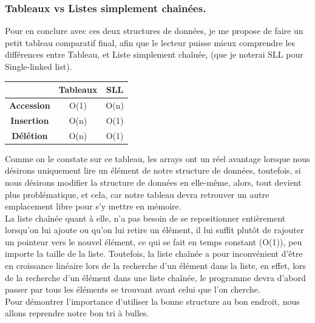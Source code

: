 \documentclass[a4paper, 12pt]{article}
\numberwithin{equation}{subsection}
\begin{document}
\subsubsection{Tableaux vs Listes simplement chaînées.}
Pour en conclure avec ces deux structures de données, je me propose de faire un petit tableau comparatif final, afin que le lecteur puisse mieux comprendre les différences entre Tableau, et Liste simplement chaînée, (que je noterai SLL pour Single-linked list).
\begin{table}[H]
  \centering
  \begin{tabular}{|c|c|c|}
    \hline & Tableaux & SLL \\
    \hline {\bf Accession} & O(1) & O(n) \\
    \hline {\bf Insertion} & O(n) & O(1) \\
    \hline {\bf Délétion}  & O(n) & O(1) \\
    \hline
  \end{tabular}
\end{table} \smallskip
Comme on le constate sur ce tableau, les arrays ont un réel avantage lorsque nous désirons uniquement lire un élément de notre structure de données, toutefois, si nous désirons modifier la structure de données en elle-même, alors, tout devient plus problématique, et cela, car notre tableau devra retrouver un autre emplacement libre pour s'y mettre en mémoire. \\

La liste chaînée quant à elle, n'a pas besoin de se repositionner entièrement lorsqu'on lui ajoute ou qu'on lui retire un élément, il lui suffit plutôt de rajouter un pointeur vers le nouvel élément, ce qui se fait en temps constant (O(1)), peu importe la taille de la liste. Toutefois, la liste chaînée a pour inconvénient d'être en croissance linéaire lors de la recherche d'un élément dans la liste, en effet, lors de la recherche d'un élément dans une liste chaînée, le programme devra d'abord passer par tous les éléments se trouvant avant celui que l'on cherche. \\

Pour démontrer l'importance d'utiliser la bonne structure au bon endroit, nous allons reprendre notre bon tri à bulles. \\
\end{document}
